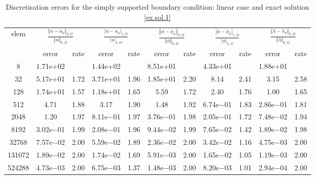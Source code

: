 \documentclass[a4paper,final]{siamltex}
\begin{document}
\begin{table}[htb!]
	\centering
	\caption{Discretisation errors  for the simply supported boundary condition: linear case and exact solution \eqref{ex.sol.1}}
	\begin{tabular}{|c|cc|cc|cc|cc|cc|}
		\hline
		\multirow{2}{*}{elem} & \multicolumn{2}{c|}{$\frac{\left\Vert u - u_h\right\Vert_{0,\Omega}}{\left\Vert u\right\Vert_{0,\Omega}}$} & \multicolumn{2}{c|}{$\frac{| u - u_h|_{1,\Omega}}{|u|_{1,\Omega}}$} & \multicolumn{2}{c|}{$\frac{\left\Vert \phi - \phi_h\right\Vert_{0,\Omega}}{\left\Vert \phi\right\Vert_{0,\Omega}}$} & \multicolumn{2}{c|}{$\frac{|\phi - \phi_h|_{1,\Omega}}{| \phi|_{1,\Omega}}$} & \multicolumn{2}{c|}{$\frac{\left\Vert \lambda - \lambda_h\right\Vert_{0,\Omega}}{\left\Vert \lambda\right\Vert_{0,\Omega}}$}\\ \hhline{~----------}
		& error & rate & error & rate & error & rate & error & rate & error & rate \\\hline
   8 & 1.71e+02 &          & 1.44e+02 &          & 8.51e+01 &          & 4.33e+01 &          & 1.88e+01 &          \\\hline
   32 & 5.17e+01 & 1.72 & 3.71e+01 & 1.96 & 1.85e+01 & 2.20 & 8.14 & 2.41 & 3.15 & 2.58 \\\hline
  128 & 1.74e+01 & 1.57 & 1.18e+01 & 1.65 & 5.59 & 1.72 & 2.40 & 1.76 & 1.00 & 1.65 \\\hline
  512 & 4.71 & 1.88 & 3.17 & 1.90 & 1.48 & 1.92 & 6.74e$-$01 & 1.83 & 2.86e$-$01 & 1.81 \\\hline
 2048 & 1.20 & 1.97 & 8.11e$-$01 & 1.97 & 3.76e$-$01 & 1.98 & 2.05e$-$01 & 1.72 & 7.48e$-$02 & 1.94 \\\hline
 8192 & 3.02e$-$01 & 1.99 & 2.08e$-$01 & 1.96 & 9.44e$-$02 & 1.99 & 7.65e$-$02 & 1.42 & 1.89e$-$02 & 1.98 \\\hline
32768 & 7.57e$-$02 & 2.00 & 5.59e$-$02 & 1.89 & 2.36e$-$02 & 2.00 & 3.42e$-$02 & 1.16 & 4.75e$-$03 & 2.00 \\\hline
131072 & 1.89e$-$02 & 2.00 & 1.74e$-$02 & 1.69 & 5.91e$-$03 & 2.00 & 1.65e$-$02 & 1.05 & 1.19e$-$03 & 2.00 \\\hline
524288 & 4.73e$-$03 & 2.00 & 6.75e$-$03 & 1.37 & 1.48e$-$03 & 2.00 & 8.20e$-$03 & 1.01 & 2.94e$-$04 & 2.00 \\\hline
		
	\end{tabular}
	\label{ss1:linear}
\end{table}
\end{document}
